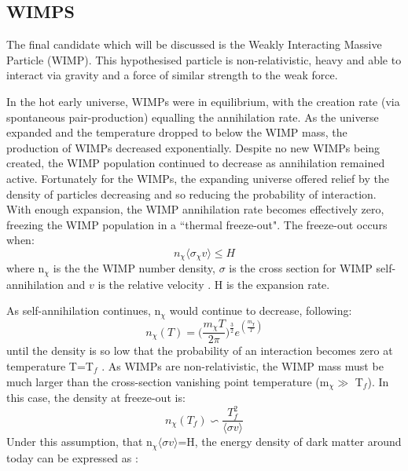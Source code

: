 \subsection{WIMPS}
\label{sec:wimp_as_a_candidate}
\par
The final candidate which will be discussed is the Weakly Interacting Massive Particle (WIMP).%
This hypothesised particle is non-relativistic, heavy and able to interact via gravity and a force of similar strength to the weak force.
\par
In the hot early universe, WIMPs were in equilibrium, with the creation rate (via spontaneous pair-production) equalling the annihilation rate.
As the universe expanded and the temperature dropped to below the WIMP mass, the production of WIMPs decreased exponentially.
Despite no new WIMPs being created, the WIMP population continued to decrease as annihilation remained active.
Fortunately for the WIMPs, the expanding universe offered relief by the density of particles decreasing and so reducing the probability of interaction.
With enough expansion, the WIMP annihilation rate becomes effectively zero, freezing the WIMP population in a ``thermal freeze-out".
The freeze-out occurs when:
\begin{equation}
    n_\chi \langle \sigma_{\chi} v \rangle \leq H
\end{equation}
where n$_\chi$ is the the WIMP number density, $\sigma$ is the cross section for WIMP self-annihilation and $v$ is the relative velocity \cite{wimp_theory_ref}.
H is the expansion rate.
\par
As self-annihilation continues, n$_\chi$ would continue to decrease, following:
\begin{equation}
    n_\chi(T) = \bigg(\frac{m_\chi T}{2\pi}\bigg)^{\frac{3}{2}} e^{(\frac{m_\chi}{T})}
\end{equation}
until the density is so low that the probability of an interaction becomes zero at temperature T=T$_f$ \cite{wimp_theory_ref}.
As WIMPs are non-relativistic, the WIMP mass must be much larger than the cross-section vanishing point temperature (m$_\chi \gg$ T$_f$).
In this case, the density at freeze-out is:
\begin{equation}
    n_\chi(T_f) \backsim \frac{T^2_f}{\langle \sigma v \rangle}
\end{equation}
Under this assumption, that n$_\chi \langle \sigma v \rangle$=H, the energy density of dark matter around today can be expressed as \cite{less_of_a_wimp_miracle_ref}:
